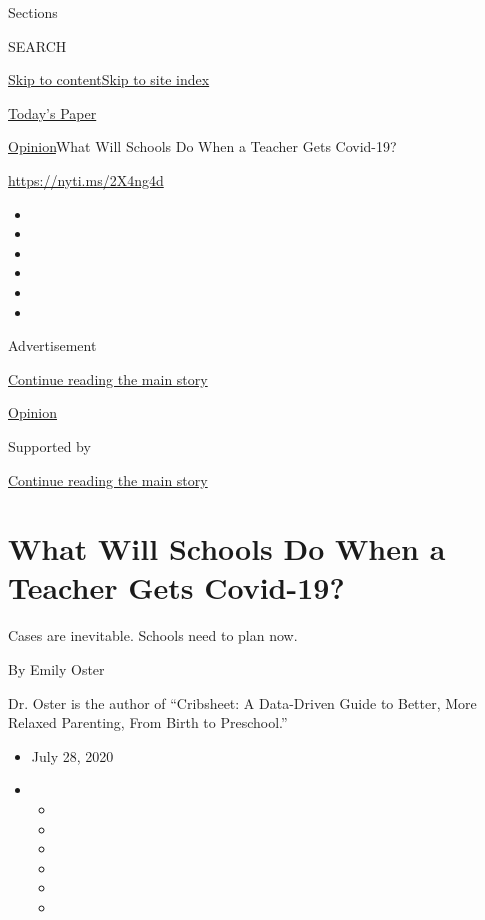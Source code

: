 Sections

SEARCH

\protect\hyperlink{site-content}{Skip to
content}\protect\hyperlink{site-index}{Skip to site index}

\href{https://myaccount.nytimes.com/auth/login?response_type=cookie\&client_id=vi}{}

\href{https://www.nytimes.com/section/todayspaper}{Today's Paper}

\href{/section/opinion}{Opinion}\textbar{}What Will Schools Do When a
Teacher Gets Covid-19?

\url{https://nyti.ms/2X4ng4d}

\begin{itemize}
\item
\item
\item
\item
\item
\item
\end{itemize}

Advertisement

\protect\hyperlink{after-top}{Continue reading the main story}

\href{/section/opinion}{Opinion}

Supported by

\protect\hyperlink{after-sponsor}{Continue reading the main story}

\hypertarget{what-will-schools-do-when-a-teacher-gets-covid-19}{%
\section{What Will Schools Do When a Teacher Gets
Covid-19?}\label{what-will-schools-do-when-a-teacher-gets-covid-19}}

Cases are inevitable. Schools need to plan now.

By Emily Oster

Dr. Oster is the author of ``Cribsheet: A Data-Driven Guide to Better,
More Relaxed Parenting, From Birth to Preschool.''

\begin{itemize}
\item
  July 28, 2020
\item
  \begin{itemize}
  \item
  \item
  \item
  \item
  \item
  \item
  \end{itemize}
\end{itemize}

